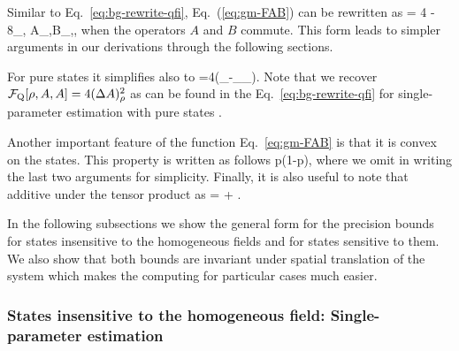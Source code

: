 Similar to Eq.~\eqref{eq:bg-rewrite-qfi}, Eq.~(\ref{eq:gm-FAB}) can be rewritten as
\be
  \label{eq:gm-FAB-rewrite-with-trace}
   = 4 
  - 8\sum_{\lambda,\nu} 
  {A}_{\lambda,\nu}{B}_{\nu,\lambda},
\ee
when the operators $A$ and $B$ commute.
This form leads to simpler arguments in our derivations through the following sections.

For pure states it simplifies also to
\be
  =4\left(_{\psi}-_{\psi}_{\psi}\right).
  \label{eq:gm-FAB-pure}
\ee
Note that we recover $\mathcal{F}_{\textnormal{Q}}[{\textstyle \rho,A,A}]=4(\Delta A)_\rho^2$ as can be found in the Eq.~\eqref{eq:bg-rewrite-qfi} for single-parameter estimation with pure states \cite{Paris2009,Toth2013}.

Another important feature of the function Eq.~\eqref{eq:gm-FAB} is that it is convex on the states.
This property is written as follows
\be
  \leqslant
  p(1{-}p),
  \label{eq:gm-FAB-convex}
\ee
where we omit in writing the last two arguments for simplicity.
Finally, it is also useful to note that additive under the tensor product as
\be
   = + .
  \label{eq:gm-FAB-additive-under-tensor}
\ee

In the following subsections we show the general form for the precision bounds for states insensitive to the homogeneous fields and for states sensitive to them. We also show that both bounds are invariant under spatial translation of the system which makes the computing for particular cases much easier.

\subsubsection{States insensitive to the homogeneous field:
Single-parameter estimation}

